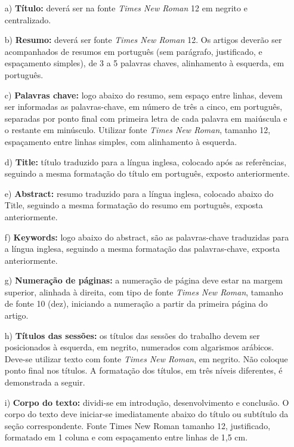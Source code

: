 \documentclass{sep}
\begin{document}
\begin{enumerate}
 \item [a)]\textbf{Título:} deverá ser na fonte \textit{Times New Roman} 12 em negrito e centralizado.

 \item [b)] \textbf{Resumo:} deverá ser fonte \textit{Times New Roman} 12.
 Os artigos deverão ser acompanhados de resumos em português (sem parágrafo, justificado, e espaçamento simples), de 3 a 5 palavras chaves, alinhamento à esquerda, em português.

 \item [c)] \textbf{Palavras chave:} logo abaixo do resumo, sem espaço entre linhas, devem ser informadas as palavras-chave, em número de três a cinco, em português, separadas por ponto final com primeira letra de cada palavra em maiúscula e o restante em minúsculo.
 Utilizar fonte \textit{Times New Roman}, tamanho 12, espaçamento entre linhas simples, com alinhamento à esquerda.

 \item [d)]\textbf{Title:} título traduzido para a língua inglesa, colocado após as referências, seguindo a mesma formatação do título em português, exposto anteriormente.

 \item [e)]\textbf{Abstract:} resumo traduzido para a língua inglesa, colocado abaixo do Title, seguindo a mesma formatação do resumo em português, exposta anteriormente.

 \item [f)]\textbf{Keywords:} logo abaixo do abstract, são as palavras-chave traduzidas para a língua inglesa, seguindo a mesma formatação das palavras-chave, exposta anteriormente.

 \item [g)]\textbf{Numeração de páginas: } a numeração de página deve estar na margem superior, alinhada à direita, com tipo de fonte \textit{Times New Roman}, tamanho de fonte 10 (dez), iniciando a numeração a partir da primeira página do artigo.

 \item [h)]\textbf{Títulos das sessões: } os títulos das sessões do trabalho devem ser posicionados à esquerda, em negrito, numerados com algarismos arábicos.
 Deve-se utilizar texto com fonte \textit{Times New Roman}, em negrito.
 Não coloque ponto final nos títulos.
 A formatação dos títulos, em três níveis diferentes, é demonstrada a seguir.

 \item [i)] \textbf{Corpo do texto:} dividi-se em introdução, desenvolvimento e conclusão.
 O corpo do texto deve iniciar-se imediatamente abaixo do título ou subtítulo da seção correspondente.
 Fonte Times New Roman tamanho 12, justificado, formatado  em 1 coluna e com espaçamento entre linhas de 1,5 cm.


\end{enumerate}
\end{document}
